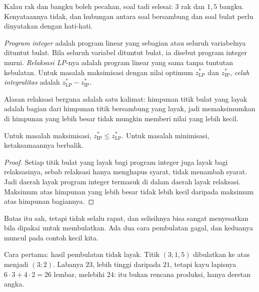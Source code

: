Kalau rak dan bangku boleh pecahan, soal tadi selesai: $3$ rak dan $1{,}5$ bangku.
Kenyataannya tidak, dan hubungan antara soal bersambung dan soal bulat perlu dinyatakan
dengan hati-hati.

\begin{definisi}
\emph{Program integer} adalah program linear yang sebagian atau seluruh variabelnya
dituntut bulat. Bila seluruh variabel dituntut bulat, ia disebut program integer murni.
\emph{Relaksasi LP}-nya adalah program linear yang sama tanpa tuntutan kebulatan. Untuk
masalah maksimisasi dengan nilai optimum $z^{*}_{\mathrm{LP}}$ dan $z^{*}_{\mathrm{IP}}$,
\emph{celah integralitas} adalah $z^{*}_{\mathrm{LP}}-z^{*}_{\mathrm{IP}}$.
\end{definisi}


Alasan relaksasi berguna adalah satu kalimat: himpunan titik bulat yang layak adalah
bagian dari himpunan titik bersambung yang layak, jadi memaksimumkan di himpunan yang lebih
besar tidak mungkin memberi nilai yang lebih kecil.

\begin{proposisi}
Untuk masalah maksimisasi, $z^{*}_{\mathrm{IP}}\le z^{*}_{\mathrm{LP}}$. Untuk masalah
minimisasi, ketaksamaannya berbalik.
\end{proposisi}

\begin{proof}
Setiap titik bulat yang layak bagi program integer juga layak bagi relaksasinya, sebab
relaksasi hanya menghapus syarat, tidak menambah syarat. Jadi daerah layak program integer
termasuk di dalam daerah layak relaksasi. Maksimum atas himpunan yang lebih besar tidak
lebih kecil daripada maksimum atas himpunan bagiannya.
\end{proof}

Batas itu sah, tetapi tidak selalu rapat, dan selisihnya bisa sangat menyesatkan bila
dipakai untuk membulatkan. Ada dua cara pembulatan gagal, dan keduanya muncul pada contoh
kecil kita.

Cara pertama: hasil pembulatan tidak layak. Titik $(3;1{,}5)$ dibulatkan ke atas menjadi
$(3;2)$. Labanya $23$, lebih tinggi daripada $21$, tetapi kayu lapisnya
$6\cdot3+4\cdot2=26$ lembar, melebihi $24$: itu bukan rencana produksi, hanya deretan
angka.

